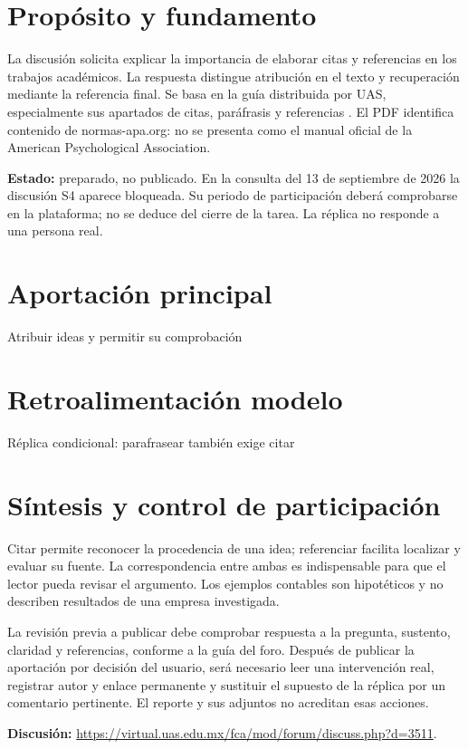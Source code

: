 


\section{Propósito y fundamento}
La discusión solicita explicar la importancia de elaborar citas y referencias en los trabajos académicos. La respuesta distingue atribución en el texto y recuperación mediante la referencia final. Se basa en la guía distribuida por UAS, especialmente sus apartados de citas, paráfrasis y referencias \parencite{guiaapa}. El PDF identifica contenido de normas-apa.org: no se presenta como el manual oficial de la American Psychological Association.

\noindent\textbf{Estado:} preparado, no publicado. En la consulta del 13 de septiembre de 2026 la discusión S4 aparece bloqueada. Su periodo de participación deberá comprobarse en la plataforma; no se deduce del cierre de la tarea. La réplica no responde a una persona real.

\section{Aportación principal}
\begin{forobox}{Atribuir ideas y permitir su comprobación}

\end{forobox}

\section{Retroalimentación modelo}
\begin{forobox}{Réplica condicional: parafrasear también exige citar}

\end{forobox}

\section{Síntesis y control de participación}
Citar permite reconocer la procedencia de una idea; referenciar facilita localizar y evaluar su fuente. La correspondencia entre ambas es indispensable para que el lector pueda revisar el argumento. Los ejemplos contables son hipotéticos y no describen resultados de una empresa investigada.

La revisión previa a publicar debe comprobar respuesta a la pregunta, sustento, claridad y referencias, conforme a la guía del foro. Después de publicar la aportación por decisión del usuario, será necesario leer una intervención real, registrar autor y enlace permanente y sustituir el supuesto de la réplica por un comentario pertinente. El reporte y sus adjuntos no acreditan esas acciones.

\noindent\textbf{Discusión:} \url{https://virtual.uas.edu.mx/fca/mod/forum/discuss.php?d=3511}.
